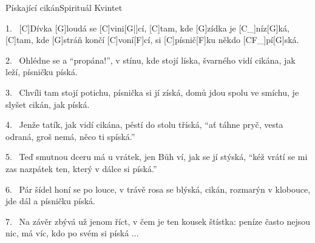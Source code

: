 %
\begin{song}{Pískající cikán}{Spirituál Kvintet}

\begin{xverse}{1.~}
[C]Dívka [G]loudá se [C]vini[G|]{cí,} [C]tam, kde [G]zídka je [C_]{níz}[G]{ká},
[C]tam, kde [G]stráň končí [C]voní[F]cí, si [C]písnič[F]ku někdo [CF_]{pí}[G]{ská}.
\end{xverse}

\begin{xverse}{2.~}
Ohlédne se a ``propána!'', v stínu, kde stojí líska,
švarného vidí cikána, jak leží, písničku píská.
\end{xverse}


\begin{xverse}{3.~}
Chvíli tam stojí potichu, písnička si jí získá,
domů jdou spolu ve smíchu, je slyšet cikán, jak píská.
\end{xverse}


\begin{xverse}{4.~}
Jenže tatík, jak vidí cikána, pěstí do stolu tříská,
``ať táhne pryč, vesta odraná, groš nemá, něco ti spíská.''
\end{xverse}


\begin{xverse}{5.~}
Teď smutnou dceru má u vrátek, jen Bůh ví, jak se jí stýská,
``kéž vrátí se mi zas nazpátek ten, který v dálce si píská.''
\end{xverse}


\begin{xverse}{6.~}
Pár šídel honí se po louce, v trávě rosa se blýská,
cikán, rozmarýn v klobouce, jde dál a písničku píská.
\end{xverse}


\begin{xverse}{7.~}
Na závěr zbývá už jenom říct, v čem je ten kousek štístka:
peníze často nejsou nic, má víc, kdo po svém si píská ...
\end{xverse}

\end{song}

